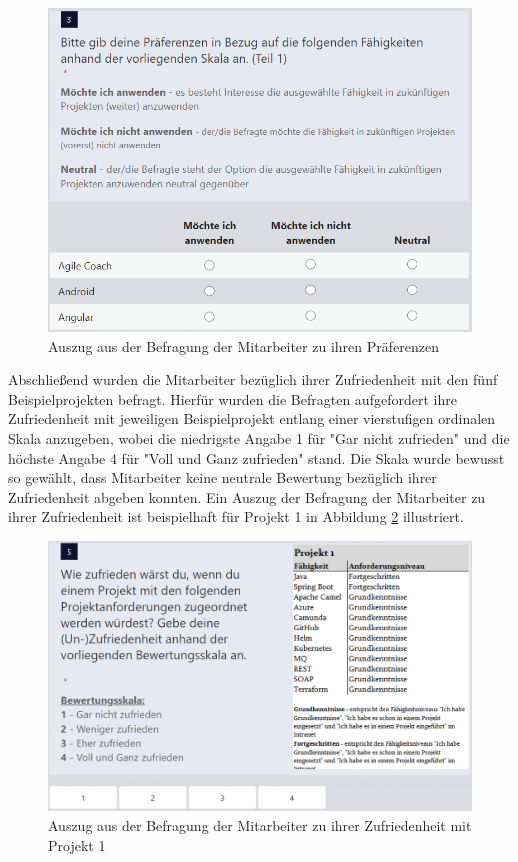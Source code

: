 \begin{figure}[H]
    \centering
	\includegraphics[width=1\textwidth]{gfx/befragung-praeferenzen.png}
	\caption[Auszug aus der Befragung der Mitarbeiter zu ihren Präferenzen]{Auszug aus der Befragung der Mitarbeiter zu ihren Präferenzen}
	\label{fig:methodik:abb4}
\end{figure}

Abschließend wurden die Mitarbeiter bezüglich ihrer Zufriedenheit mit den fünf Beispielprojekten befragt.
Hierfür wurden die Befragten aufgefordert ihre Zufriedenheit mit jeweiligen Beispielprojekt entlang einer vierstufigen ordinalen Skala anzugeben, wobei die niedrigste Angabe 1 für "Gar nicht zufrieden" und die höchste Angabe 4 für "Voll und Ganz zufrieden" stand.
Die Skala wurde bewusst so gewählt, dass Mitarbeiter keine neutrale Bewertung bezüglich ihrer Zufriedenheit abgeben konnten.
Ein Auszug der Befragung der Mitarbeiter zu ihrer Zufriedenheit ist beispielhaft für Projekt 1 in Abbildung \ref{fig:methodik:abb5} illustriert.

\begin{figure}[H]
    \centering
	\includegraphics[width=1\textwidth]{gfx/befragung-zufriedenheit.png}
	\caption[Auszug aus der Befragung der Mitarbeiter zu ihrer Zufriedenheit mit Projekt 1]{Auszug aus der Befragung der Mitarbeiter zu ihrer Zufriedenheit mit Projekt 1}
	\label{fig:methodik:abb5}
\end{figure}

